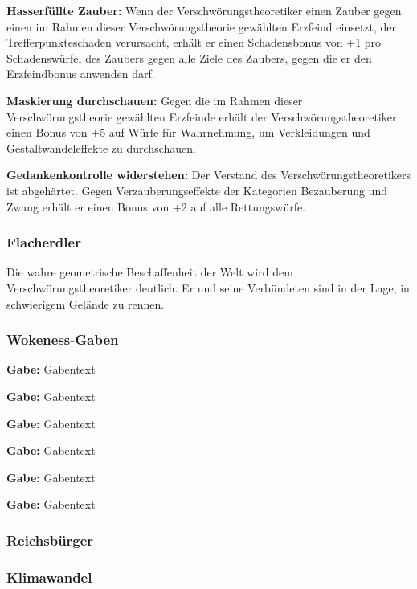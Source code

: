 \documentclass[
	ngerman,
	a4paper,
	11pt,
	twocolumn,
]{scrartcl}
\begin{document}
\textbf{Hasserfüllte Zauber:} Wenn der Verschwörungstheoretiker einen Zauber gegen einen im Rahmen dieser Verschwörungstheorie gewählten Erzfeind einsetzt, der Trefferpunkteschaden verursacht, erhält er einen Schadensbonus von +1 pro Schadenswürfel des Zaubers gegen alle Ziele des Zaubers, gegen die er den Erzfeindbonus anwenden darf.

\textbf{Maskierung durchschauen:} Gegen die im Rahmen dieser Verschwörungstheorie gewählten Erzfeinde erhält der Verschwörungstheoretiker einen Bonus von +5 auf Würfe für Wahrnehmung, um Verkleidungen und Gestaltwandeleffekte zu durchschauen.

\textbf{Gedankenkontrolle widerstehen:} Der Verstand des Verschwörungstheoretikers ist abgehärtet. Gegen Verzauberungseffekte der Kategorien Bezauberung und Zwang erhält er einen Bonus von +2 auf alle Rettungswürfe.



\subsubsection*{Flacherdler}

Die wahre geometrische Beschaffenheit der Welt wird dem Verschwörungstheoretiker deutlich. Er und seine Verbündeten sind in der Lage, in schwierigem Gelände zu rennen.

\vspace{-3ex}

\subsubsection*{Wokeness-Gaben}

\textbf{Gabe:} Gabentext

\textbf{Gabe:} Gabentext

\textbf{Gabe:} Gabentext

\textbf{Gabe:} Gabentext

\textbf{Gabe:} Gabentext

\textbf{Gabe:} Gabentext



\subsubsection*{Reichsbürger}

\subsubsection*{Klimawandel}
\end{document}
